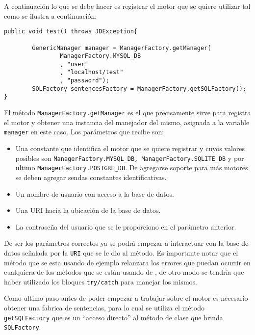 A continuación lo que se debe hacer es registrar el motor que se quiere utilizar tal como se ilustra a continuación:	
%
\begin{lstlisting}[title=Registrando el motor que se quiere utilizar.]
public void test() throws JDException{
		
		GenericManager manager = ManagerFactory.getManager(
				ManagerFactory.MYSQL_DB
				, "user"
				, "localhost/test"
				, "password");
		SQLFactory sentencesFactory = ManagerFactory.getSQLFactory();
}
\end{lstlisting}
%
El método \verb=ManagerFactory.getManager= es el que precisamente sirve para registra el motor y obtener una instancia del manejador del mismo, asignada a la variable \verb=manager= en este caso. Los parámetros que recibe son:
\begin{itemize}
\item Una constante que identifica el motor que se quiere registrar y cuyos valores posibles son \verb=ManagerFactory.MYSQL_DB, ManagerFactory.SQLITE_DB= y por ultimo \verb=ManagerFactory.POSTGRE_DB=. De agregarse soporte para más motores se deben agregar sendas constantes identificativas.
\item Un nombre de usuario con acceso a la base de datos.
\item Una URI hacia la ubicación de la base de datos.
\item La contraseña del usuario que se le proporciono en el parámetro anterior.
\end{itemize}
De ser los parámetros correctos ya se podrá empezar a interactuar con la base de datos señalada por la \verb=URI= que se le dio al método. Es importante notar que el método que se esta usando de ejemplo relanzara los errores que puedan ocurrir en cualquiera de los métodos que se están usando de \jj, de otro modo se tendría que haber utilizado los bloques \verb=try/catch= para manejar los mismos.

Como ultimo paso antes de poder empezar a trabajar sobre el motor es necesario obtener una fabrica de sentencias, para lo cual se utiliza el método \verb=getSQLFactory= que es un ``acceso directo'' al método de clase que brinda \verb=SQLFactory=.
%
